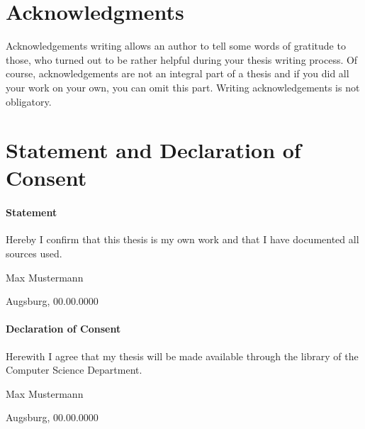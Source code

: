 \documentclass[12pt, a4paper, fleqn]{memoir}%
\begin{document}
\chapter*{Acknowledgments}
Acknowledgements writing allows an author to tell some words of gratitude to those, who turned out to be rather helpful during your thesis writing process. Of course, acknowledgements are not an integral part of a thesis and if you did all your work on your own, you can omit this part. Writing acknowledgements is not obligatory.

\chapter*{Statement and Declaration of Consent}
\vfill
\subsubsection*{\LARGE Statement}
Hereby I confirm that this thesis is my own work and that I have documented all sources used.
\vfill
\begin{flushleft}
Max Mustermann
\end{flushleft}  
\begin{flushright}
Augsburg, 00.00.0000 
\end{flushright}
\vfill
\vfill
\subsubsection*{\LARGE Declaration of Consent}
Herewith I agree that my thesis will be made available through the library of the Computer Science Department.
\vfill
\begin{flushleft}
Max Mustermann
\end{flushleft}  
\begin{flushright}
Augsburg, 00.00.0000 
\end{flushright}
\vfill

\cleardoublepage
\rmfamily
\normalfont
{}
\pagestyle{headings}
\tableofcontents
\end{document}
